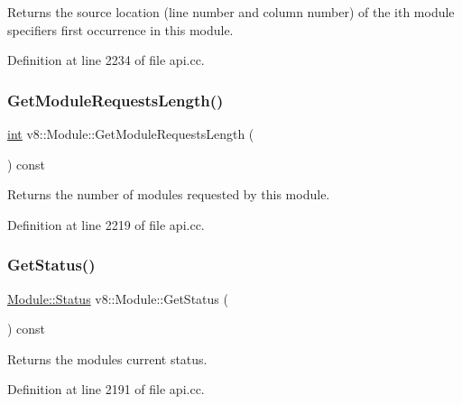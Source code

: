 Returns the source location (line number and column number) of the ith module specifier\textquotesingle{}s first occurrence in this module. 

Definition at line 2234 of file api.\+cc.

\mbox{\label{classv8_1_1Module_a323acfb19889ba4e16b81f1c3d89c2b9}} 
\subsubsection{\texorpdfstring{Get\+Module\+Requests\+Length()}{GetModuleRequestsLength()}}
{\footnotesize\ttfamily \mbox{\hyperlink{classint}{int}} v8\+::\+Module\+::\+Get\+Module\+Requests\+Length (\begin{DoxyParamCaption}{ }\end{DoxyParamCaption}) const}

Returns the number of modules requested by this module. 

Definition at line 2219 of file api.\+cc.

\mbox{\label{classv8_1_1Module_ae123fe0c62d7e119a98af732f36c1ef4}} 
\subsubsection{\texorpdfstring{Get\+Status()}{GetStatus()}}
{\footnotesize\ttfamily \mbox{\hyperlink{classv8_1_1Module_a9c2a22c9cb8e928d570c38648c648b7e}{Module\+::\+Status}} v8\+::\+Module\+::\+Get\+Status (\begin{DoxyParamCaption}{ }\end{DoxyParamCaption}) const}

Returns the module\textquotesingle{}s current status. 

Definition at line 2191 of file api.\+cc.

\mbox{\label{classv8_1_1Module_ac77824569c55c041a5a97a3e6ec422f3}} 
